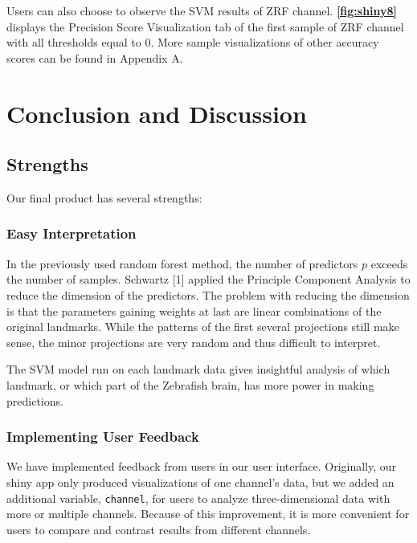 \documentclass[10pt,letterpaper]{article}
\begin{document}
Users can also choose to observe the SVM results of ZRF channel.
\textbf{\autoref{fig:shiny8}} displays the Precision Score Visualization
tab of the first sample of ZRF channel with all thresholds equal to 0.
More sample visualizations of other accuracy scores can be found in
Appendix A.

\section{Conclusion and Discussion}\label{conclusion-and-discussion}

\subsection{Strengths}\label{strengths}

Our final product has several strengths:

\subsubsection{Easy Interpretation}\label{easy-interpretation}

In the previously used random forest method, the number of predictors
\(p\) exceeds the number of samples. Schwartz {[}1{]} applied the
Principle Component Analysis to reduce the dimension of the predictors.
The problem with reducing the dimension is that the parameters gaining
weights at last are linear combinations of the original landmarks. While
the patterns of the first several projections still make sense, the
minor projections are very random and thus difficult to interpret.

The SVM model run on each landmark data gives insightful analysis of
which landmark, or which part of the Zebrafish brain, has more power in
making predictions.

\subsubsection{Implementing User
Feedback}\label{implementing-user-feedback}

We have implemented feedback from users in our user interface.
Originally, our shiny app only produced visualizations of one channel's
data, but we added an additional variable, \texttt{channel}, for users
to analyze three-dimensional data with more or multiple channels.
Because of this improvement, it is more convenient for users to compare
and contrast results from different channels.
\end{document}
